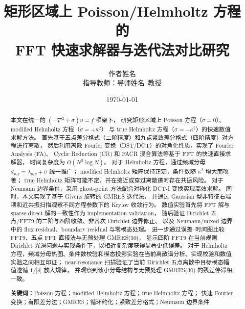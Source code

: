 \documentclass[12pt,a4paper]{ctexart}
\title{\textbf{矩形区域上 Poisson/Helmholtz 方程的 \\ FFT 快速求解器与迭代法对比研究}}
\author{作者姓名 \\ 指导教师：导师姓名\ 教授}
\date{\today}
\begin{document}
\maketitle

\begin{abstract}
本文在统一的 $(-\nabla^2 + \sigma)u = f$ 框架下，
研究矩形区域上 Poisson 方程（$\sigma=0$）、modified Helmholtz 方程（$\sigma=+\kappa^2$）
与 true Helmholtz 方程（$\sigma=-\kappa^2$）的快速数值求解方法。
首先基于五点差分格式（二阶精度）和九点紧致差分格式（四阶精度）对方程进行离散，
然后利用离散 Fourier 变换（DST/DCT）的对角化性质，实现了 Fourier Analysis (FA)、
Cyclic Reduction (CR) 和 FACR 混合算法等基于 FFT 的快速直接求解器，
时间复杂度为 $O(N^2 \log N)$。
对于 Helmholtz 方程，通过频域分母 $d_{p,q}=\lambda_{p,q}+\sigma$ 统一推广；
modified Helmholtz 矩阵保持正定，条件数随 $\kappa^2$ 增大而改善；
true Helmholtz 矩阵可能不定，并在接近或穿过离散谱时存在共振风险。
对于 Neumann 边界条件，采用 ghost-point 方法配合对称化 DCT-I 变换实现高效求解。
同时，本文实现了基于 Givens 旋转的 GMRES 迭代法，
并通过 Gaussian 型非特征右端项和近共振扫描观察不同方程参数下的 Krylov 收敛行为。
数值实验首先将 FFT 解与 sparse direct 解的一致性作为 implementation validation，
随后验证 Dirichlet 五点/FFT9 的二阶与四阶收敛、非齐次 Dirichlet 边界修正、
以及 Neumann/mixed 边界中的 flux residual、boundary residual 与零模态处理。
进一步通过误差--时间图比较 FFT9、五点 FFT 直接法与无预处理 GMRES(30)，
显示四阶 FFT9 在当前规则 Dirichlet 光滑问题与实现条件下，以相近复杂度获得显著更低误差。
对于 Helmholtz 方程，频域分母热图、条件数校验和模态投影实验在当前离散谱分析、实现校验和数值实验之间相互印证；
near-resonance 扫描验证了当前 Dirichlet 五点离散中目标模态幅值遵循 $1/|\delta|$ 放大规律，
并观察到该小分母结构与无预处理 GMRES(30) 的残差停滞相一致。

\vspace{1em}
\noindent\textbf{关键词：}Poisson 方程；modified Helmholtz 方程；true Helmholtz 方程；
快速 Fourier 变换；有限差分法；GMRES；循环约化；紧致差分格式；Neumann 边界条件
\end{abstract}

\newpage
\tableofcontents
\newpage








\end{document}
